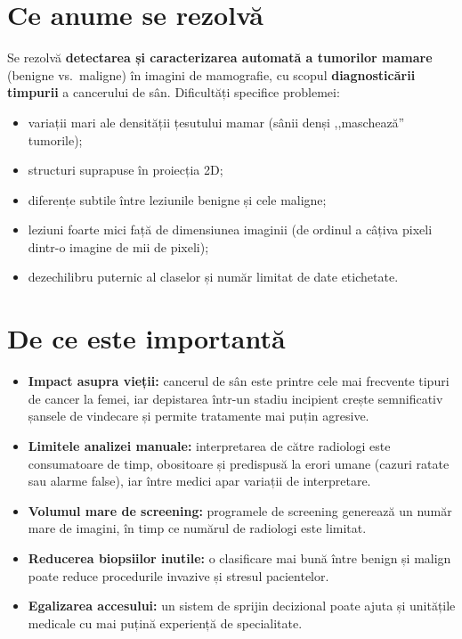 \documentclass[runningheads,a4paper,11pt]{report}
\begin{document}
\section{Ce anume se rezolvă}
\label{section:whatSolved}

Se rezolvă \textbf{detectarea și caracterizarea automată a tumorilor mamare} (benigne vs.\ maligne) în imagini de mamografie, cu scopul \textbf{diagnosticării timpurii} a cancerului de sân. Dificultăți specifice problemei:
\begin{itemize}
	\item variații mari ale densității țesutului mamar (sânii denși ,,maschează'' tumorile);
	\item structuri suprapuse în proiecția 2D;
	\item diferențe subtile între leziunile benigne și cele maligne;
	\item leziuni foarte mici față de dimensiunea imaginii (de ordinul a câțiva pixeli dintr-o imagine de mii de pixeli);
	\item dezechilibru puternic al claselor și număr limitat de date etichetate.
\end{itemize}

\section{De ce este importantă}
\label{section:whyImportant}

\begin{itemize}
	\item \textbf{Impact asupra vieții:} cancerul de sân este printre cele mai frecvente tipuri de cancer la femei, iar depistarea într-un stadiu incipient crește semnificativ șansele de vindecare și permite tratamente mai puțin agresive.
	\item \textbf{Limitele analizei manuale:} interpretarea de către radiologi este consumatoare de timp, obositoare și predispusă la erori umane (cazuri ratate sau alarme false), iar între medici apar variații de interpretare.
	\item \textbf{Volumul mare de screening:} programele de screening generează un număr mare de imagini, în timp ce numărul de radiologi este limitat.
	\item \textbf{Reducerea biopsiilor inutile:} o clasificare mai bună între benign și malign poate reduce procedurile invazive și stresul pacientelor.
	\item \textbf{Egalizarea accesului:} un sistem de sprijin decizional poate ajuta și unitățile medicale cu mai puțină experiență de specialitate.
\end{itemize}
\end{document}
